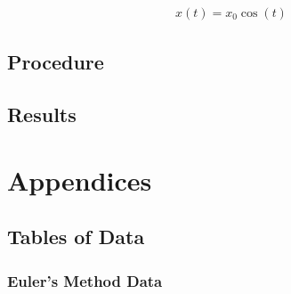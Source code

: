 \documentclass[pdf,color]{UoBnote}
\begin{document}
	\begin{align}
	x(t) = x_0\cos(t)
	\end{align}
	
	\subsection{Procedure}
	
	\subsection{Results}
	
	
			
\section{Appendices}

	\subsection{Tables of Data}
		\subsubsection{Euler's Method Data}
		
\end{document}

